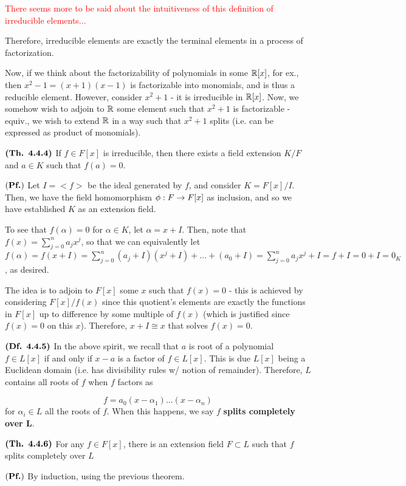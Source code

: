 \documentclass{article}
\begin{document}
\textcolor{red}{There seems more to be said about the intuitiveness of this definition of irreducible elements...}

Therefore, irreducible elements are exactly the terminal elements in a process of factorization.

Now, if we think about the factorizability of polynomials in some $\mathbb{R}[x]$, for ex., then $x^2 - 1 = (x+1)(x-1)$ is factorizable into monomials, and is thus a reducible element. However, consider $x^2+1$ - it is irreducible in $\mathbb{R}[x]$. Now, we somehow wish to adjoin to $\mathbb{R}$ some element such that $x^2 + 1$ is factorizable - equiv., we wish to extend $\mathbb{R}$ in a way such that $x^2 + 1$ splits (i.e. can be expressed as product of monomials). 

$\textbf{(Th. 4.4.4)}$ If $f \in F[x]$ is irreducible, then there exists a field extension $K/F$ and $a \in K$ such that $f(a) = 0$.

$(\textbf{Pf.})$ Let $I=<f>$ be the ideal generated by $f$, and consider $K = F[x]/I$. Then, we have the field homomorphism $\phi:F \rightarrow F[x]$ as inclusion, and so we have established $K$ as an extension field.

To see that $f(\alpha) = 0$ for $\alpha \in K$, let $\alpha = x + I$. Then, note that $f(x) = \sum_{j=0}^n a_jx^j$, so that we can equivalently let $f(\alpha)= f(x+I) = \sum_{j=0}^n (a_j+I)(x^j + I) + ... + (a_0 + I) = \sum_{j=0}^n a_jx^j + I = f + I = 0 + I = 0_K$, as desired.


The idea is to adjoin to $F[x]$ some $x$ such that $f(x) = 0$ - this is achieved by considering $F[x]/f(x)$ since this quotient's elements are exactly the functions in $F[x]$ up to difference by some multiple of $f(x)$ (which is justified since $f(x) = 0$ on this $x$). Therefore, $x + I \cong x$ that solves $f(x) = 0$.

$\textbf{(Df. 4.4.5)}$ In the above spirit, we recall that $a$ is root of a polynomial $f \in L[x]$ if and only if $x - a$ is a factor of $f \in L[x]$. This is due $L[x]$ being a Euclidean domain (i.e. has divisibility rules w/ notion of remainder). Therefore, $L$ contains all roots of $f$ when $f$ factors as 

$$f = a_0(x-\alpha_1)...(x - \alpha_n)$$ for $\alpha_i \in L$ all the roots of $f$. When this happens, we say $f$ \textbf{splits completely over L}.

$\textbf{(Th. 4.4.6)}$ For any $f \in F[x]$, there is an extension field $F \subset L$ such that $f$ splits completely over $L$

$(\textbf{Pf.})$ By induction, using the previous theorem.
\end{document}

